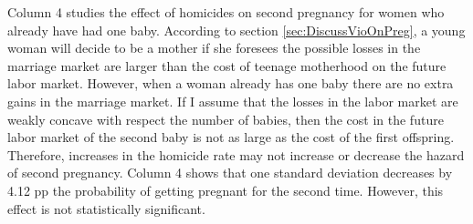 \documentclass[a4paper,10pt,twocolumn,preprint,3p,authoryear]{elsarticle}
\begin{document}
Column 4 studies the effect of homicides on second pregnancy for women who already have had one baby. According to section \ref{sec:DiscussVioOnPreg}, a young woman will decide to be a mother if she foresees the possible losses in the marriage market are larger than the cost of teenage motherhood on the future labor market. However, when a woman already has one baby there are no extra gains in the marriage market. If I assume that the losses in the labor market are weakly concave with respect the number of babies, then the cost in the future labor market of the second baby is not as large as the cost of the first offspring. Therefore, increases in the homicide rate may not increase or decrease the hazard of second pregnancy. Column 4 shows that one standard deviation decreases by 4.12 pp the probability of getting pregnant for the second time. However, this effect is not statistically significant.
\end{document}

